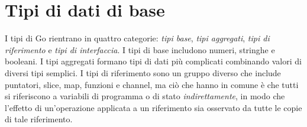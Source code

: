 \documentclass[../thesis.tex]{subfiles}
\begin{document}
    \newpage


    \section{Tipi di dati di base}\label{sec:tipi-di-dati-di-base}
    I tipi di Go rientrano in quattro categorie: \textit{tipi base}, \textit{tipi aggregati}, \textit{tipi di riferimento} e \textit{tipi di interfaccia}.
    I tipi di base includono numeri, stringhe e booleani.
    I tipi aggregati formano tipi di dati più complicati combinando valori di diversi tipi semplici.
    I tipi di riferimento sono un gruppo diverso che include puntatori, slice, map, funzioni e channel, ma ciò che hanno in comune è che tutti si riferiscono a variabili di programma o di stato \textit{indirettamente}, in modo che l'effetto di un'operazione applicata a un riferimento sia osservato da tutte le copie di tale riferimento.
    
    
    
    \clearpage
\end{document}
